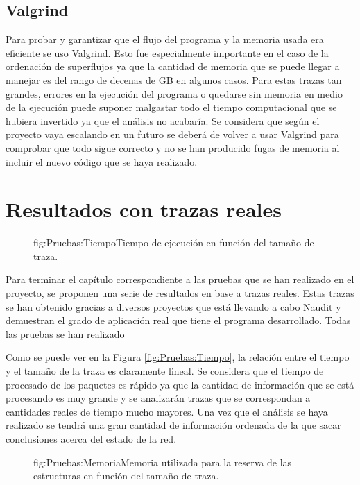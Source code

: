 \documentclass[tfg,epsbased,lof,lot,loa,final,nocopyright,overleaf]{tfgtfmthesisuam}
\begin{document}
\subsection{Valgrind}
Para probar y garantizar que el flujo del programa y la memoria usada era eficiente se uso Valgrind. Esto fue especialmente importante en el caso de la ordenación de superflujos ya que la cantidad de memoria que se puede llegar a manejar es del rango de decenas de GB en algunos casos. Para estas trazas tan grandes, errores en la ejecución del programa o quedarse sin memoria en medio de la ejecución puede suponer malgastar todo el tiempo computacional que se hubiera invertido ya que el análisis no acabaría. Se considera que según el proyecto vaya escalando en un futuro se deberá de volver a usar Valgrind para comprobar que todo sigue correcto y no se han producido fugas de memoria al incluir el nuevo código que se haya realizado.

\section{Resultados con trazas reales}

\begin{figure}[Gráfica de tiempo de ejecución]{fig:Pruebas:Tiempo}{Tiempo de ejecución en función del tamaño de traza.}
\end{figure}

Para terminar el capítulo correspondiente a las pruebas que se han realizado en el proyecto, se proponen una serie de resultados en base a trazas reales. Estas trazas se han obtenido gracias a diversos proyectos que está llevando a cabo Naudit y demuestran el grado de aplicación real que tiene el programa desarrollado. Todas las pruebas se han realizado

Como se puede ver en la Figura \ref{fig:Pruebas:Tiempo}, la relación entre el tiempo y el tamaño de la traza es claramente lineal. Se considera que el tiempo de procesado de los paquetes es rápido ya que la cantidad de información que se está procesando es muy grande y se analizarán trazas que se correspondan a cantidades reales de tiempo mucho mayores. Una vez que el análisis se haya realizado se tendrá una gran cantidad de información ordenada de la que sacar conclusiones acerca del estado de la red.

\begin{figure}[Gráfica de memoria usada]{fig:Pruebas:Memoria}{Memoria utilizada para la reserva de las estructuras en función del tamaño de traza.}
\end{figure}
\end{document}
